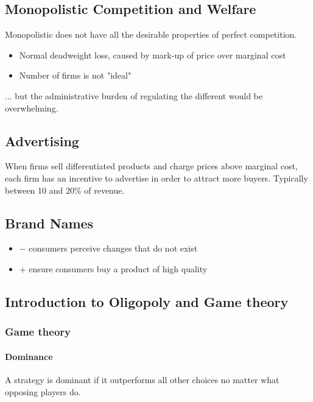 \documentclass[a4paper,titlepage] {scrartcl}
\begin{document}

\subsection{Monopolistic Competition and Welfare} %
\label{sub:monopolistic_competition_and_welfare}
Monopolistic does not have all the desirable properties of perfect competition.
\begin{itemize}
	\item Normal deadweight loss, caused by mark-up of price over marginal cost
	\item Number of firms is not "ideal"
\end{itemize}

... but the administrative burden of regulating the different would be overwhelming.
	

\subsection{Advertising} %
\label{sub:advertising}
When firms sell differentiated products and charge prices above marginal cost, each firm has an incentive to advertise in order to attract more buyers. Typically between 10 and 20\% of revenue.

\subsection{Brand Names}
\begin{itemize}
	\item $-$ consumers perceive changes that do not exist
	\item $+$ ensure consumers buy a product of high quality
\end{itemize}

\subsection{Introduction to Oligopoly and Game theory} %
\label{sub:models_of_imperfect_competitions}
\subsubsection{Game theory}
\paragraph{Dominance} %
\label{par:dominance}
A strategy is dominant if it outperforms all other choices no matter what opposing players do.
\end{document}
